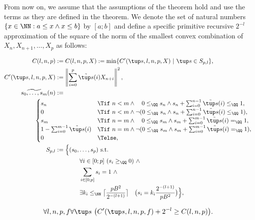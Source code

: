 From now on, we assume that the assumptions of the theorem hold and use the terms as they are defined in the theorem. 
We denote the set of natural numbers $\{x\in\NN : a\leq x\wedge x\leq b\}$ by $[a;b]$ and define
a specific primitive recursive $2^{-l}$ approximation of the square of the norm of the smallest 
convex combination of $X_n, X_{n+1}, \ldots, X_p$ as follows:
\begin{dfn}[$C$]\label{d:C}  
\begin{align*}
C(l,n,p) &:= C(l,n,p, X) := \min\{ C'(\tup s,l,n,p,X)\ |\ \tup s\in S_{p,l}\},\\
C'(\tup s, l,n,p, X) &:= \left\|\sum^{p}_{i=0} \tilde {\tup s}(i)X_{n+i}\right\|^2,\\
 \widetilde {s_0,\ldots,s_m}(n) &:=\\
&\hspace{-35pt}\begin{cases}
s_n&\Tif\ n< m\wedge \ \ \ 0\leq_\QQ s_n \wedge s_n+\sum^{n-1}_{i=0} \tilde {\tup s}(i) \leq_\QQ 1,\\
0&\Tif\ n< m\wedge \neg(   0\leq_\QQ s_n \wedge s_n+\sum^{n-1}_{i=0} \tilde {\tup s}(i) \leq_\QQ 1),\\
s_m&\Tif\ n= m\wedge \ \ \  0\leq_\QQ s_m \wedge s_m+\sum^{m-1}_{i=0} \tilde {\tup s}(i) =_\QQ 1,\\
1 - \sum^{m-1}_{i=0} \tilde{\tup s}(i)&\Tif\ n= m\wedge \neg(  0\leq_\QQ s_m \wedge s_m+\sum^{m-1}_{i=0} \tilde {\tup s}(i) =_\QQ 1),\\
0&\Telse,
\end{cases}\\
S_{p,l}&:=\Big\{(s_0,\ldots,s_p)\ \text{s.t.}\\
&\hspace{40pt} \forall i\in [0;p]\ (s_i\geq_\QQ 0)\ \wedge
\\&\hspace{40pt} 
\sum_{i\in [0;p]} s_i = 1 \ \wedge
\\&\hspace{40pt} 
\exists k_i\leq_\NN \big\lceil\frac{pB^2}{2^{-(l+1)}}\big\rceil\quad\big( s_i=k_i\frac{2^{-(l+1)}}{pB^2}\big)\Big\},
\end{align*}
\end{dfn}
\begin{lemma}\label{l:newC}
\[
\forall l,n,p,f \forall \tup s\ \big( C'(\tup s,l,n,p,f)+2^{-l}\geq C(l,n,p) \big).
\]
\end{lemma}
